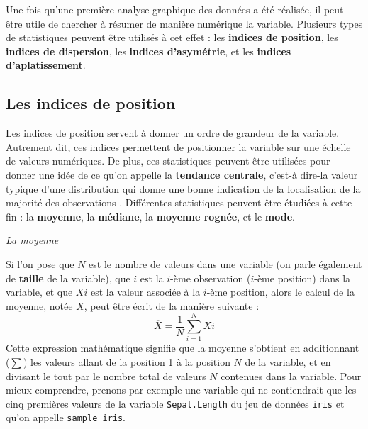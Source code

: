 \documentclass[
  french,
]{book}
\newenvironment{Shaded}{\begin{snugshade}}{\end{snugshade}}
\newcommand{\DecValTok}[1]{\textcolor[rgb]{0.00,0.00,0.81}{#1}}
\newcommand{\NormalTok}[1]{#1}
\newcommand{\OperatorTok}[1]{\textcolor[rgb]{0.81,0.36,0.00}{\textbf{#1}}}
\newcommand{\StringTok}[1]{\textcolor[rgb]{0.31,0.60,0.02}{#1}}
\begin{document}
Une fois qu'une première analyse graphique des données a été réalisée, il peut être utile de chercher à résumer de manière numérique la variable. Plusieurs types de statistiques peuvent être utilisés à cet effet : les \textbf{indices de position}, les \textbf{indices de dispersion}, les \textbf{indices d'asymétrie}, et les \textbf{indices d'aplatissement}.

\hypertarget{les-indices-de-position}{%
\subsection{Les indices de position}\label{les-indices-de-position}}

Les indices de position servent à donner un ordre de grandeur de la variable. Autrement dit, ces indices permettent de positionner la variable sur une échelle de valeurs numériques. De plus, ces statistiques peuvent être utilisées pour donner une idée de ce qu'on appelle la \textbf{tendance centrale}, c'est-à dire-la valeur typique d'une distribution qui donne une bonne indication de la localisation de la majorité des observations \autocite{rousseletReactionTimesOther2020}. Différentes statistiques peuvent être étudiées à cette fin : la \textbf{moyenne}, la \textbf{médiane}, la \textbf{moyenne rognée}, et le \textbf{mode}.

\emph{La moyenne}

Si l'on pose que \(N\) est le nombre de valeurs dans une variable (on parle également de \textbf{taille} de la variable), que \(i\) est la \(i\)-ème observation (\(i\)-ème position) dans la variable, et que \(X{i}\) est la valeur associée à la \(i\)-ème position, alors le calcul de la moyenne, notée \(\overline{X}\), peut être écrit de la manière suivante :
\[\overline{X} = \frac{1}{N}\sum_{i=1}^{N} X{i}\]
Cette expression mathématique signifie que la moyenne s'obtient en additionnant (\(\sum\)) les valeurs allant de la position 1 à la position \(N\) de la variable, et en divisant le tout par le nombre total de valeurs \(N\) contenues dans la variable. Pour mieux comprendre, prenons par exemple une variable qui ne contiendrait que les cinq premières valeurs de la variable \texttt{Sepal.Length} du jeu de données \texttt{iris} et qu'on appelle \texttt{sample\_iris}.

\begin{Shaded}
\end{Shaded}
\end{document}
